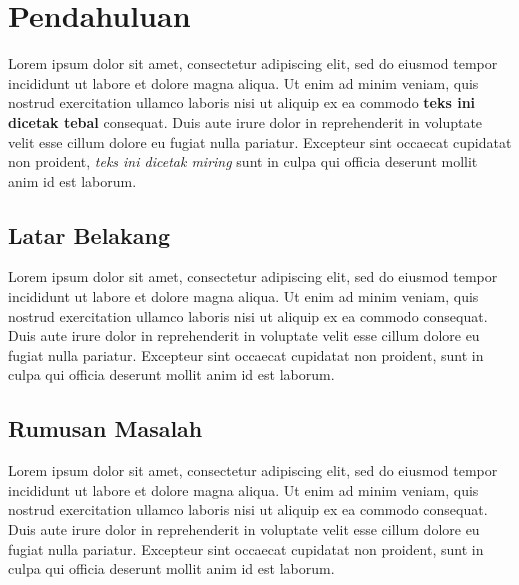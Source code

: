 \documentclass[12pt,hidelinks]{report}
\begin{document}
\tableofcontents
{}

\listoftables
{}

\listoffigures
{}

\chapter{Pendahuluan}
    Lorem ipsum dolor sit amet, consectetur adipiscing elit, sed do eiusmod tempor incididunt ut labore et dolore magna aliqua. Ut enim ad minim veniam, quis nostrud exercitation ullamco laboris nisi ut aliquip ex ea commodo \textbf{teks ini dicetak tebal} consequat. Duis aute irure dolor in reprehenderit in voluptate velit esse cillum dolore eu fugiat nulla pariatur. Excepteur sint occaecat cupidatat non proident, \textit{teks ini dicetak miring} sunt in culpa qui officia deserunt mollit anim id est laborum.

\section{Latar Belakang}
    Lorem ipsum dolor sit amet, consectetur adipiscing elit, sed do eiusmod tempor incididunt ut labore et dolore magna aliqua. Ut enim ad minim veniam, quis nostrud exercitation ullamco laboris nisi ut aliquip ex ea commodo consequat. Duis aute irure dolor in reprehenderit in voluptate velit esse cillum dolore eu fugiat nulla pariatur. Excepteur sint occaecat cupidatat non proident, sunt in culpa qui officia deserunt mollit anim id est laborum. 

\section{Rumusan Masalah}
    Lorem ipsum dolor sit amet, consectetur adipiscing elit, sed do eiusmod tempor incididunt ut labore et dolore magna aliqua. Ut enim ad minim veniam, quis nostrud exercitation ullamco laboris nisi ut aliquip ex ea commodo consequat. Duis aute irure dolor in reprehenderit in voluptate velit esse cillum dolore eu fugiat nulla pariatur. Excepteur sint occaecat cupidatat non proident, sunt in culpa qui officia deserunt mollit anim id est laborum. 
\end{document}
